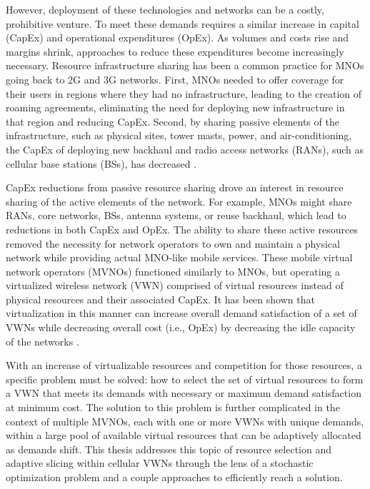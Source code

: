 \documentclass[12pt,dvips]{report}
\begin{document}
However, deployment of these technologies and networks can be a costly, prohibitive venture.  To meet these demands requires a similar increase in capital (CapEx) and operational expenditures (OpEx).  As volumes and costs rise and margins shrink, approaches to reduce these expenditures become increasingly necessary.  Resource infrastructure sharing has been a common practice for MNOs going back to 2G and 3G networks.  First, MNOs needed to offer coverage for their users in regions where they had no infrastructure, leading to the creation of roaming agreements, eliminating the need for deploying new infrastructure in that region and reducing CapEx.  Second, by sharing passive elements of the infrastructure, such as physical sites, tower masts, power, and air-conditioning, the CapEx of deploying new backhaul and radio access networks (RANs), such as cellular base stations (BSs), has decreased \cite{1421931}.

CapEx reductions from passive resource sharing drove an interest in resource sharing of the active elements of the network.  For example, MNOs might share RANs, core networks, BSs, antenna systems, or reuse backhaul, which lead to reductions in both CapEx and OpEx.  The ability to share these active resources removed the necessity for network operators to own and maintain a physical network while providing actual MNO-like mobile services.  These mobile virtual network operators (MVNOs) functioned similarly to MNOs, but operating a virtualized wireless network (VWN) comprised of virtual resources instead of physical resources and their associated CapEx.  It has been shown that virtualization in this manner can increase overall demand satisfaction of a set of VWNs while decreasing overall cost (i.e., OpEx) by decreasing the idle capacity of the networks \cite{MJ_CCNC_16}.

With an increase of virtualizable resources and competition for those resources, a specific problem must be solved: how to select the set of virtual resources to form a VWN that meets its demands with necessary or maximum demand satisfaction at minimum cost.  The solution to this problem is further complicated in the context of multiple MVNOs, each with one or more VWNs with unique demands, within a large pool of available virtual resources that can be adaptively allocated as demands shift.  This thesis addresses this topic of resource selection and adaptive slicing within cellular VWNs through the lens of a stochastic optimization problem and a couple approaches to efficiently reach a solution.
\end{document}
